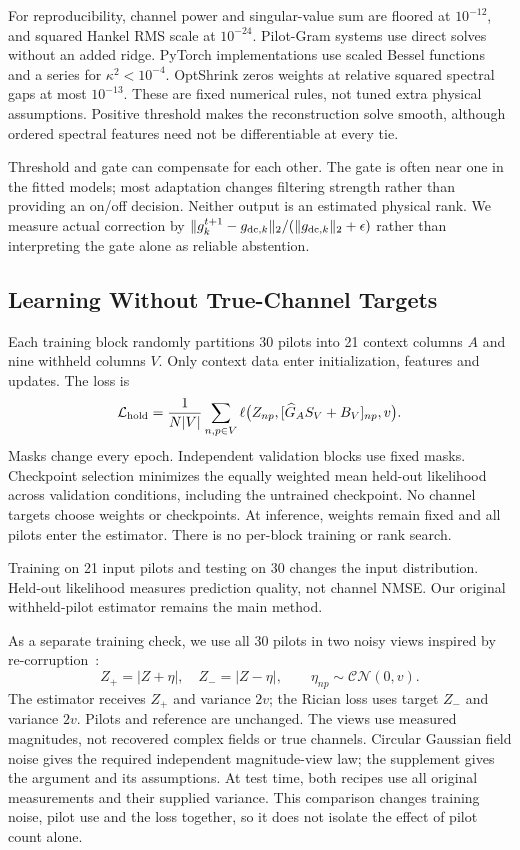 \documentclass[10pt,journal,letterpaper]{IEEEtran}
\newcommand{\CN}{\mathcal{CN}}
\begin{document}
For reproducibility, channel power and singular-value sum are floored at $10^{-12}$, and squared Hankel RMS scale at $10^{-24}$. Pilot-Gram systems use direct solves without an added ridge. PyTorch implementations use scaled Bessel functions and a series for $\kappa^2<10^{-4}$. OptShrink zeros weights at relative squared spectral gaps at most $10^{-13}$. These are fixed numerical rules, not tuned extra physical assumptions. Positive threshold makes the reconstruction solve smooth, although ordered spectral features need not be differentiable at every tie.

Threshold and gate can compensate for each other. The gate is often near one in the fitted models; most adaptation changes filtering strength rather than providing an on/off decision. Neither output is an estimated physical rank. We measure actual correction by $\|g_k^{t+1}-g_{{\rm dc},k}\|_2/(\|g_{{\rm dc},k}\|_2+\epsilon)$ rather than interpreting the gate alone as reliable abstention.

\subsection{Learning Without True-Channel Targets}
Each training block randomly partitions 30 pilots into 21 context columns $A$ and nine withheld columns $V$. Only context data enter initialization, features and updates. The loss is
\begin{equation}
 \mathcal L_{\rm hold}=\frac{1}{N|V|}\sum_{n,p\in V}
 \ell\big(Z_{np},[\widehat G_A S_V+B_V]_{np},v\big).
\end{equation}
Masks change every epoch. Independent validation blocks use fixed masks. Checkpoint selection minimizes the equally weighted mean held-out likelihood across validation conditions, including the untrained checkpoint. No channel targets choose weights or checkpoints. At inference, weights remain fixed and all pilots enter the estimator. There is no per-block training or rank search.

Training on 21 input pilots and testing on 30 changes the input distribution. Held-out likelihood measures prediction quality, not channel NMSE. Our original withheld-pilot estimator remains the main method.

As a separate training check, we use all 30 pilots in two noisy views inspired by re-corruption~\cite{pang2021r2r}:
\begin{equation}
 Z_+=|Z+\eta|,\quad Z_-=|Z-\eta|,\qquad \eta_{np}\sim\CN(0,v).
\end{equation}
The estimator receives $Z_+$ and variance $2v$; the Rician loss uses target $Z_-$ and variance $2v$. Pilots and reference are unchanged. The views use measured magnitudes, not recovered complex fields or true channels. Circular Gaussian field noise gives the required independent magnitude-view law; the supplement gives the argument and its assumptions. At test time, both recipes use all original measurements and their supplied variance. This comparison changes training noise, pilot use and the loss together, so it does not isolate the effect of pilot count alone.
\end{document}
